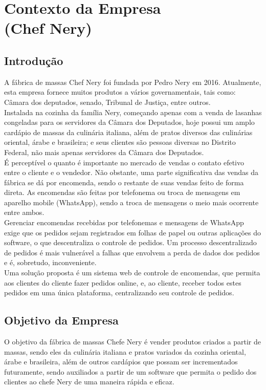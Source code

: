 
\chapter[Contexto da Empresa]{Contexto da Empresa \\ (Chef Nery)}
{\large {\section { Introdução \\ } } }

{A fábrica de massas Chef Nery foi fundada por Pedro Nery em 2016. Atualmente,
esta empresa fornece muitos produtos a vários governamentais, tais como: Câmara dos
deputados, senado, Tribunal de Justiça, entre outros. \\
}
{\tab Instalada na cozinha da família Nery, começando apenas com a venda de lasanhas
congeladas para os servidores da Câmara dos Deputados, hoje possui um amplo cardápio
de massas da culinária italiana, além de pratos diversos das culinárias oriental, árabe e
brasileira; e seus clientes são pessoas diversas no Distrito Federal, não mais apenas
servidores da Câmara dos Deputados. \\
}
{\tab É perceptível o quanto é importante no mercado de vendas o contato efetivo entre o
cliente e o vendedor. Não obstante, uma parte significativa das vendas da fábrica se dá por
encomenda, sendo o restante de suas vendas feito de forma direta. As encomendas são
feitas por telefonema ou troca de mensagens em aparelho mobile (WhatsApp), sendo a
troca de mensagens o meio mais ocorrente entre ambos. \\
}
{\tab Gerenciar encomendas recebidas por telefonemas e mensagens de WhatsApp exige
que os pedidos sejam registrados em folhas de papel ou outras aplicações do software, o
que descentraliza o controle de pedidos. Um processo descentralizado de pedidos é mais
vulnerável a falhas que envolvem a perda de dados dos pedidos e é, sobretudo,
inconveniente. \\
}
{\tab Uma solução proposta é um sistema web de controle de encomendas, que permita
aos clientes do cliente fazer pedidos online, e, ao cliente, receber todos estes pedidos em
uma única plataforma, centralizando seu controle de pedidos. \\
}

{\large {\section { Objetivo da Empresa \\ } } }

{\tab O objetivo da fábrica de massas Chefe Nery é vender produtos criados a partir de
massas, sendo eles da culinária italiana e pratos variados da cozinha oriental, árabe e
brasileira, além de outros cardápios que possam ser incrementados futuramente, sendo
auxiliados a partir de um software que permita o pedido dos clientes ao chefe Nery de uma
maneira rápida e eficaz.
}
